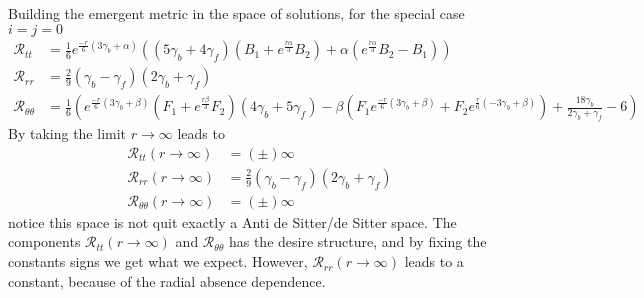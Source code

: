 \documentclass{article}
\begin{document}
Building the emergent metric in the space of solutions, for the special case $ i = j = 0$
\begin{align}
    \mathcal{R}_{tt} & = \frac{1}{6}e^{\frac{-r}{6}\left(3\gamma_b + \alpha\right)}\left(\left(5\gamma_b + 4\gamma_f\right)
    \left(B_1 +e^{\frac{r\alpha}{3}}B_2\right) + \alpha\left(e^{\frac{r\alpha}{3}}B_2 - B_1\right)\right) \\
    \mathcal{R}_{rr} & = \frac{2}{9}\left(\gamma_b - \gamma_f\right)\left(2\gamma_b + \gamma_f\right)\\
    \mathcal{R}_{\theta\theta} & = \frac{1}{6}\left(e^{\frac{-r}{6}\left(3\gamma_b + \beta\right)}\left(F_1 + e^{\frac{r\beta}{3}}F_2\right)\left(4\gamma_b + 5\gamma_f\right) - 
    \beta\left(F_1 e^{\frac{-r}{6}\left(3\gamma_b + \beta\right)} + F_2 e^{\frac{r}{6}\left(-3\gamma_b + \beta\right)}\right) + \frac{18\gamma_b}{2\gamma_b + \gamma_f} - 6\right)
\end{align}
By taking the limit $r \to \infty$ leads to
\begin{align}
    \mathcal{R}_{tt}(r \to \infty) & = (\pm)\infty \\
    \mathcal{R}_{rr}(r \to \infty) & = \frac{2}{9}\left(\gamma_b - \gamma_f\right)\left(2\gamma_b + \gamma_f\right)\\
    \mathcal{R}_{\theta\theta}(r \to \infty) & = (\pm)\infty
\end{align}
notice this space is not quit exactly a Anti de Sitter/de Sitter space. The components $\mathcal{R}_{tt}(r \to \infty)$
and $\mathcal{R}_{\theta\theta}$ has the desire structure, and by fixing the constants signs we get what we expect. However,
$\mathcal{R}_{rr}(r \to \infty)$ leads to a constant, because of the radial absence dependence. 
\end{document}
